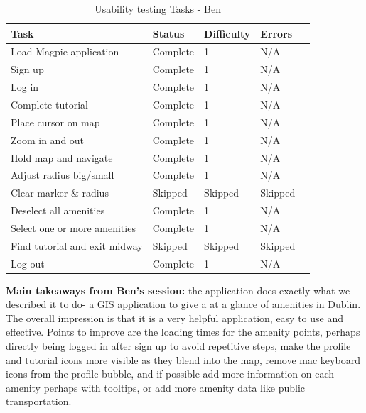 \begin{table}[h!]
  \centering
  \caption{Usability testing Tasks - Ben}
  \begin{tabular}{|p{}|p{}|p{}|p{}|p{}|}
    \hline
    \textbf{Task}                 & \textbf{Status} & \textbf{Difficulty} & \textbf{Errors} \\
    \hline
    Load Magpie application       & Complete        & 1                   & N/A             \\
    \hline
    Sign up                       & Complete        & 1                   & N/A             \\
    \hline
    Log in                        & Complete        & 1                   & N/A             \\
    \hline
    Complete tutorial             & Complete        & 1                   & N/A             \\
    \hline
    Place cursor on map           & Complete        & 1                   & N/A             \\
    \hline
    Zoom in and out               & Complete        & 1                   & N/A             \\
    \hline
    Hold map and navigate         & Complete        & 1                   & N/A             \\
    \hline
    Adjust radius big/small       & Complete        & 1                   & N/A             \\
    \hline
    Clear marker \& radius        & Skipped         & Skipped             & Skipped         \\
    \hline
    Deselect all amenities        & Complete        & 1                   & N/A             \\
    \hline
    Select one or more amenities  & Complete        & 1                   & N/A             \\
    \hline
    Find tutorial and exit midway & Skipped         & Skipped             & Skipped         \\
    \hline
    Log out                       & Complete        & 1                   & N/A             \\
    \hline
  \end{tabular}
\end{table}

\noindent\textbf{Main takeaways from Ben's session: }the application does
exactly what we described it to do- a GIS application to give a at a glance of
amenities in Dublin. The overall impression is that it is a very helpful
application, easy to use and effective. Points to improve are the loading times
for the amenity points, perhaps directly being logged in after sign up to avoid
repetitive steps, make the profile and tutorial icons more visible as they blend
into the map, remove mac keyboard icons from the profile bubble, and if possible
add more information on each amenity perhaps with tooltips, or add more amenity
data like public transportation.

